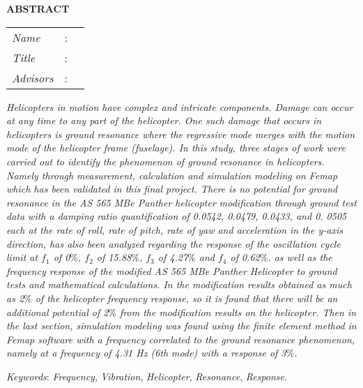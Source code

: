 \begin{center}
  \large\textbf{ABSTRACT}
\end{center}


\vspace{2ex}

\begingroup
\setlength{\tabcolsep}{0pt}

\noindent
\begin{tabularx}{\textwidth}{l >{\centering}m{3em} X}
  \emph{Name}     & : & \name{}         \\

  \emph{Title}    & : & \engtatitle{}   \\

  \emph{Advisors} & : & \advisor{}   \\
  
\end{tabularx}
\endgroup

\emph{Helicopters in motion have complex and intricate components. Damage can occur at any time to any part of the helicopter. One such damage that occurs in helicopters is ground resonance where the regressive mode merges with the motion mode of the helicopter frame (fuselage). In this study, three stages of work were carried out to identify the phenomenon of ground resonance in helicopters. Namely through measurement, calculation and simulation modeling on Femap which has been validated in this final project. There is no potential for ground resonance in the AS 565 MBe Panther helicopter modification through ground test data with a damping ratio quantification of 0.0542, 0.0479, 0.0433, and 0. 0505 each at the rate of roll, rate of pitch, rate of yaw and acceleration in the y-axis direction, has also been analyzed regarding the response of the oscillation cycle limit at $f_1$ of 0$\%$, $f_2$ of 15.88$\%$, $f_3$ of 4.27$\%$ and $f_4$ of 0.62$\%$. as well as the frequency response of the modified AS 565 MBe Panther Helicopter to ground tests and mathematical calculations. In the modification results obtained as much as 2$\%$ of the helicopter frequency response, so it is found that there will be an additional potential of 2$\%$ from the modification results on the helicopter. Then in the last section, simulation modeling was found using the finite element method in Femap software with a frequency correlated to the ground resonance phenomenon, namely at a frequency of 4.31 Hz (6th mode) with a response of 3$\%$.}

\emph{Keywords}: \emph{Frequency}, \emph{Vibration}, \emph{Helicopter}, \emph{Resonance}, \emph{Response}.
